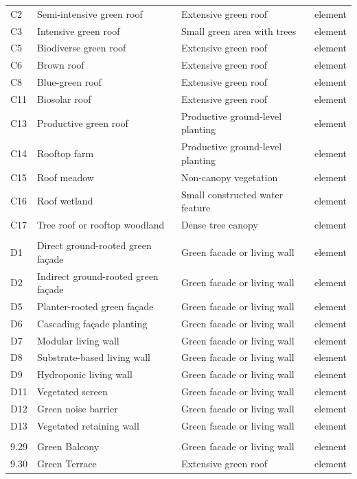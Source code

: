{\begin{longtable}{@{}l>{\raggedright\arraybackslash}p{52mm}
                    >{\raggedright\arraybackslash}p{42mm}l@{}}
C2 & Semi-intensive green roof & Extensive green roof & element \\
C3 & Intensive green roof & Small green area with trees & element \\
C5 & Biodiverse green roof & Extensive green roof & element \\
C6 & Brown roof & Extensive green roof & element \\
C8 & Blue-green roof & Extensive green roof & element \\
C11 & Biosolar roof & Extensive green roof & element \\
C13 & Productive green roof & Productive ground-level planting & element \\
C14 & Rooftop farm & Productive ground-level planting & element \\
C15 & Roof meadow & Non-canopy vegetation & element \\
C16 & Roof wetland & Small constructed water feature & element \\
C17 & Tree roof or rooftop woodland & Dense tree canopy & element \\
\addlinespace
\multicolumn{4}{@{}l}{\textit{Vertical greening} (10)}\\
D1 & Direct ground-rooted green façade & Green facade or living wall & element \\
D2 & Indirect ground-rooted green façade & Green facade or living wall & element \\
D5 & Planter-rooted green façade & Green facade or living wall & element \\
D6 & Cascading façade planting & Green facade or living wall & element \\
D7 & Modular living wall & Green facade or living wall & element \\
D8 & Substrate-based living wall & Green facade or living wall & element \\
D9 & Hydroponic living wall & Green facade or living wall & element \\
D11 & Vegetated screen & Green facade or living wall & element \\
D12 & Green noise barrier & Green facade or living wall & element \\
D13 & Vegetated retaining wall & Green facade or living wall & element \\
\addlinespace
\multicolumn{4}{@{}l}{\textit{Building} (5)}\\
9.29 & Green Balcony & Green facade or living wall & element \\
9.30 & Green Terrace & Extensive green roof & element \\

\end{longtable}}
